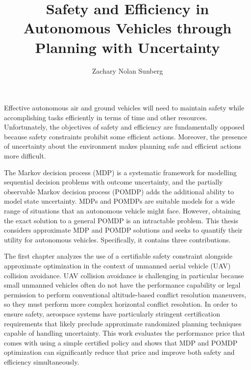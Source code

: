 \documentclass[12pt]{report}
\title{Safety and Efficiency in Autonomous Vehicles through Planning with Uncertainty}
\author{Zachary Nolan Sunberg}
\begin{document}
\beforepreface 


Effective autonomous air and ground vehicles will need to maintain safety while accomplishing tasks efficiently in terms of time and other resources.
Unfortunately, the objectives of safety and efficiency are fundamentally opposed because safety constraints prohibit some efficient actions.
Moreover, the presence of uncertainty about the environment makes planning safe and efficient actions more difficult.

The Markov decision process (MDP) is a systematic framework for modelling sequential decision problems with outcome uncertainty, and the partially observable Markov decision process (POMDP) adds the additional ability to model state uncertainty.
MDPs and POMDPs are suitable models for a wide range of situations that an autonomous vehicle might face.
However, obtaining the exact solution to a general POMDP is an intractable problem. %
This thesis considers approximate MDP and POMDP solutions and seeks to quantify their utility for autonomous vehicles.
Specifically, it contains three contributions.

The first chapter analyzes the use of a certifiable safety constraint alongside approximate optimization in the context of unmanned aerial vehicle (UAV) collision avoidance.
UAV collision avoidance is challenging in particular because small unmanned vehicles often do not have the performance capability or legal permission to perform conventional altitude-based conflict resolution maneuvers, so they must perform more complex horizontal conflict resolution.
In order to ensure safety, aerospace systems have particularly stringent certification requirements that likely preclude approximate randomized planning techniques capable of handling uncertainty.
This work evaluates the performance price that comes with using a simple certified policy and shows that MDP and POMDP optimization can significantly reduce that price and improve both safety and efficiency simultaneously.
\end{document}
